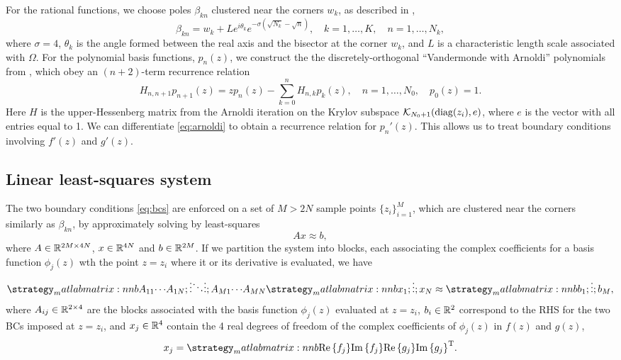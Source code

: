 For the rational functions, we choose poles $\beta_{kn}$ clustered near the corners $w_k$, as described in \cite{gopal19},
\begin{equation}
\beta_{kn} = w_k + Le^{i\theta_k} e^{-\sigma (\sqrt{N_k}-\sqrt{n})}, \quad k=1,\ldots,K,\quad n=1,\ldots,N_k,
\end{equation}
where $\sigma=4$, $\theta_k$ is the angle formed between the real axis and the bisector at the corner $w_k$, and $L$ is a characteristic length scale associated with $\Omega$. For the polynomial basis functions, $p_n(z)$, we construct the  the discretely-orthogonal ``Vandermonde with Arnoldi'' polynomials from \cite{brubeck19}, which obey an $(n+2)$-term recurrence relation
\begin{equation} \label{eq:arnoldi}
H_{n,n+1} p_{n+1}(z) = z p_n(z) - \sum_{k=0}^n H_{n,k} p_k(z),\quad n=1,\ldots,N_0, \quad p_0(z)=1.
\end{equation}
Here $H$ is the upper-Hessenberg matrix from the Arnoldi iteration on the Krylov subspace $\mathcal{K}_{N_0+1}(\operatorname{diag}(z_i), e)$, where $e$ is the vector with all entries equal to 1. We can differentiate \eqref{eq:arnoldi} to obtain a recurrence relation for $p_n'(z)$. This allows us to treat boundary conditions involving $f'(z)$ and $g'(z)$.



\subsection{Linear least-squares system}
The two boundary conditions \eqref{eq:bcs} are enforced on a set of $M > 2N$ sample points $\{z_i \}_{i=1}^M$, which
are clustered near the corners similarly as $\beta_{kn}$, by approximately solving by least-squares
\begin{equation} \label{eq:LS}
A x\approx b,
\end{equation}
where $A\in\mathbb{R}^{2M\times 4N}$, $x\in\mathbb{R}^{4N}$ and $b\in\mathbb{R}^{2M}$. If we partition the system into blocks, each associating the complex coefficients for a basis function $\phi_j(z)$ wth the point $z=z_i$ where it or its derivative is evaluated, we have
\begin{equation}
\matlabmatrix{A_{11} {\cdots} A_{1N}; {\vdots} {\ddots} {\vdots}; A_{M1} {\cdots} A_{MN}}
\matlabmatrix{x_{1}; {\vdots}; x_{N}} \approx \matlabmatrix{b_{1}; {\vdots}; b_{M}},
\end{equation}
where $A_{ij}\in\mathbb{R}^{2\times 4}$ are the blocks associated with the basis function $\phi_{j}(z)$ evaluated at $z=z_i$, $b_i\in\mathbb{R}^2$ correspond to the RHS for the two BCs imposed at $z=z_i$, and $x_j\in\mathbb{R}^4$ contain the 4 real degrees of freedom of the complex coefficients of $\phi_j(z)$ in $f(z)$ and $g(z)$,
\begin{equation}
x_ j = \matlabmatrix{\real{f_j} \imag{f_j} \real{g_j} \imag{g_j}}^\transp.
\end{equation}


